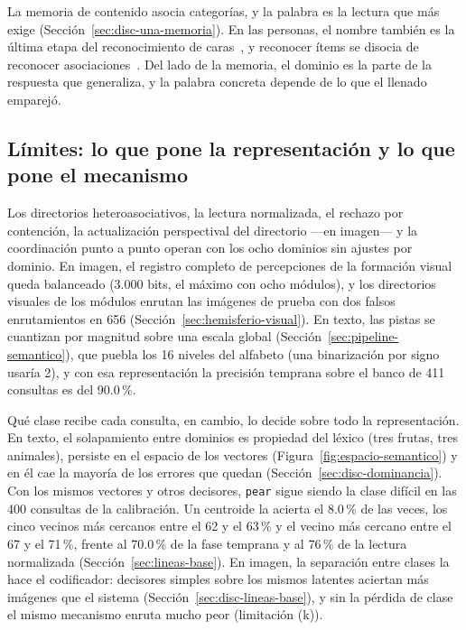 La memoria de contenido asocia categorías, y la palabra es la lectura que más exige
(Sección~\ref{sec:disc-una-memoria}).
En las personas, el nombre también es la última etapa del reconocimiento de
caras~\cite{bruce1986understanding}, y reconocer ítems se disocia de reconocer
asociaciones~\cite{mayes2004associative}.
Del lado de la memoria, el dominio es la parte de la respuesta que generaliza, y la palabra
concreta depende de lo que el llenado emparejó.

\subsection{Límites: lo que pone la representación y lo que pone el mecanismo}
\label{fase:disc-limites}
\label{sec:disc-escala}

Los directorios heteroasociativos, la lectura normalizada, el rechazo por contención,
la actualización perspectival del directorio ---en imagen--- y la coordinación punto a
punto operan con los ocho dominios sin ajustes por dominio.
En imagen, el registro completo de percepciones de la formación visual queda balanceado
(3.000 bits, el máximo con ocho módulos), y los directorios visuales de los módulos
enrutan las imágenes de prueba con dos falsos enrutamientos en 656
(Sección~\ref{sec:hemisferio-visual}).
En texto, las pistas se cuantizan por magnitud sobre una escala global
(Sección~\ref{sec:pipeline-semantico}), que puebla los 16 niveles del alfabeto (una
binarización por signo usaría 2), y con esa representación la precisión temprana sobre
el banco de 411 consultas es del 90.0\,\%.

Qué clase recibe cada consulta, en cambio, lo decide sobre todo la representación.
En texto, el solapamiento entre dominios es propiedad del léxico (tres frutas, tres
animales), persiste en el espacio de los vectores (Figura~\ref{fig:espacio-semantico}) y
en él cae la mayoría de los errores que quedan (Sección~\ref{sec:disc-dominancia}).
Con los mismos vectores y otros decisores, \texttt{pear} sigue siendo la clase difícil
en las 400 consultas de la calibración.
Un centroide la acierta el 8.0\,\% de las veces, los cinco vecinos más cercanos entre
el 62 y el 63\,\% y el vecino más cercano entre el 67 y el 71\,\%, frente al 70.0\,\% de
la fase temprana y al 76\,\% de la lectura normalizada (Sección~\ref{sec:lineas-base}).
En imagen, la separación entre clases la hace el codificador: decisores simples sobre
los mismos latentes aciertan más imágenes que el sistema
(Sección~\ref{sec:disc-lineas-base}), y sin la pérdida de clase el mismo mecanismo
enruta mucho peor (limitación (k)).

